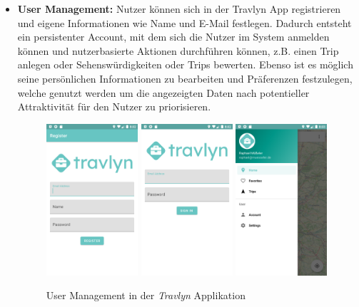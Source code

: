 \begin{itemize}
	\item \textbf{User Management:} Nutzer können sich in der Travlyn App registrieren und eigene Informationen wie Name und E-Mail festlegen. Dadurch entsteht ein persistenter Account, mit dem sich die Nutzer im System anmelden können und nutzerbasierte Aktionen durchführen können, z.B. einen Trip anlegen oder Sehenswürdigkeiten oder Trips bewerten. Ebenso ist es möglich seine persönlichen Informationen zu bearbeiten und Präferenzen festzulegen, welche genutzt werden um die angezeigten Daten nach potentieller Attraktivität für den Nutzer zu priorisieren.
	
	
	\begin{figure}[ht!]
		\includegraphics[width=0.32\textwidth]{images/travlyn-screenshot-register.png}
		\includegraphics[width=0.32\textwidth]{images/travlyn-screenshot-login.png}
		\includegraphics[width=0.32\textwidth]{images/travlyn-screenshot-side-navigation.png}
		\caption{User Management in der \textit{Travlyn} Applikation}
		\label{fig:ui_usermanagement}
	\end{figure}


\end{itemize}
